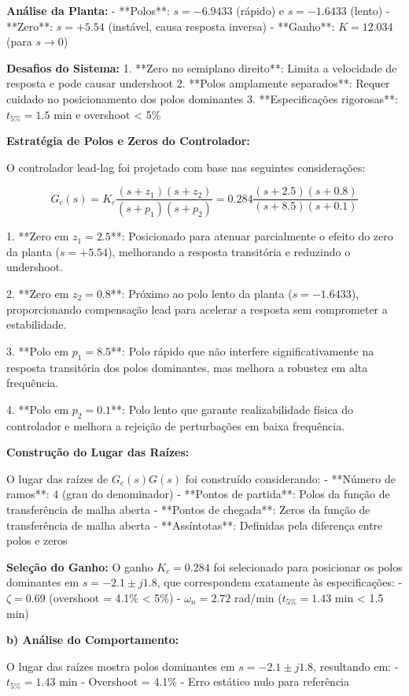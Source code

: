 \documentclass[a4paper,12pt]{article}
\begin{document}
\textbf{Análise da Planta:}
- **Polos**: $s = -6.9433$ (rápido) e $s = -1.6433$ (lento)
- **Zero**: $s = +5.54$ (instável, causa resposta inversa)
- **Ganho**: $K = 12.034$ (para $s \rightarrow 0$)

\textbf{Desafios do Sistema:}
1. **Zero no semiplano direito**: Limita a velocidade de resposta e pode causar undershoot
2. **Polos amplamente separados**: Requer cuidado no posicionamento dos polos dominantes
3. **Especificações rigorosas**: $t_{5\%} = 1.5$ min e overshoot < 5\%

\textbf{Estratégia de Polos e Zeros do Controlador:}

O controlador lead-lag foi projetado com base nas seguintes considerações:

$$G_c(s) = K_c \frac{(s + z_1)(s + z_2)}{(s + p_1)(s + p_2)} = 0.284 \frac{(s + 2.5)(s + 0.8)}{(s + 8.5)(s + 0.1)}$$

1. **Zero em $z_1 = 2.5$**: Posicionado para atenuar parcialmente o efeito do zero da planta ($s = +5.54$), melhorando a resposta transitória e reduzindo o undershoot.

2. **Zero em $z_2 = 0.8$**: Próximo ao polo lento da planta ($s = -1.6433$), proporcionando compensação lead para acelerar a resposta sem comprometer a estabilidade.

3. **Polo em $p_1 = 8.5$**: Polo rápido que não interfere significativamente na resposta transitória dos polos dominantes, mas melhora a robustez em alta frequência.

4. **Polo em $p_2 = 0.1$**: Polo lento que garante realizabilidade física do controlador e melhora a rejeição de perturbações em baixa frequência.

\textbf{Construção do Lugar das Raízes:}

O lugar das raízes de $G_c(s)G(s)$ foi construído considerando:
- **Número de ramos**: 4 (grau do denominador)
- **Pontos de partida**: Polos da função de transferência de malha aberta
- **Pontos de chegada**: Zeros da função de transferência de malha aberta
- **Assíntotas**: Definidas pela diferença entre polos e zeros

\textbf{Seleção do Ganho:}
O ganho $K_c = 0.284$ foi selecionado para posicionar os polos dominantes em $s = -2.1 \pm j1.8$, que correspondem exatamente às especificações:
- $\zeta = 0.69$ (overshoot = 4.1\% < 5\%)
- $\omega_n = 2.72$ rad/min ($t_{5\%} = 1.43$ min < 1.5 min)

\textbf{b) Análise do Comportamento:}

O lugar das raízes mostra polos dominantes em $s = -2.1 \pm j1.8$, resultando em:
- $t_{5\%} = 1.43$ min
- Overshoot = 4.1\%
- Erro estático nulo para referência
\end{document}
